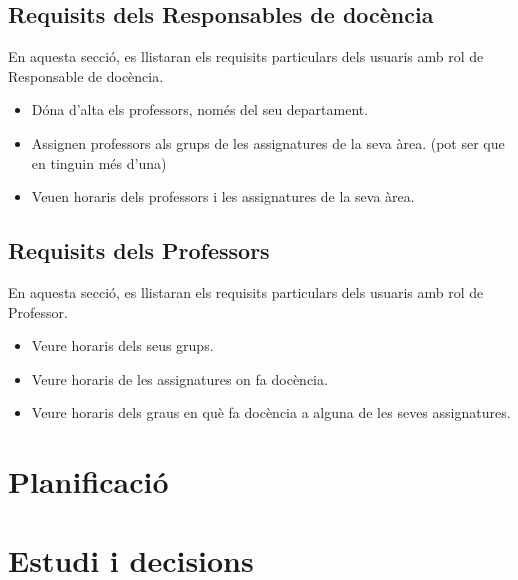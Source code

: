 \documentclass[a4paper,12pt]{ThesisStyle}
\begin{document}
\section{Requisits dels Responsables de docència} %
\label{sec:requisits_responsables_docencia}

En aquesta secció, es llistaran els requisits particulars dels usuaris amb rol de Responsable de docència.

\begin{itemize} %
  \item Dóna d'alta els professors, només del seu departament.
  \item Assignen professors als grups de les assignatures de la seva àrea. (pot ser que en tinguin més d'una)
  \item Veuen horaris dels professors i les assignatures de la seva àrea.
\end{itemize}

\section{Requisits dels Professors} %
\label{sec:requisits_professors}

En aquesta secció, es llistaran els requisits particulars dels usuaris amb rol de Professor.

\begin{itemize} %
  \item Veure horaris dels seus grups.
  \item Veure horaris de les assignatures on fa docència.
  \item Veure horaris dels graus en què fa docència a alguna de les seves assignatures.
\end{itemize}

\chapter{Planificació}  %
\label{cap:planificacio}



\chapter{Estudi i decisions}
\label{cap:estudi}
\end{document}

